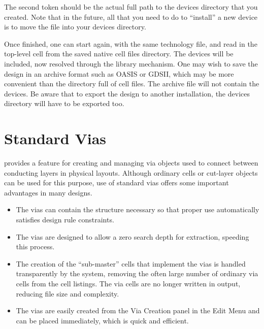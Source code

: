 The second token should be the actual full path to the {\vt devices}
directory that you created.  Note that in the future, all that you
need to do to ``install'' a new device is to move the file into your
{\vt devices} directory.

Once finished, one can start {\Xic} again, with the same technology
file, and read in the top-level cell from the saved native cell files
directory.  The devices will be included, now resolved through the
library mechanism.  One may wish to save the design in an archive
format such as OASIS or GDSII, which may be more convenient than the
directory full of cell files.  The archive file will not contain the
devices.  Be aware that to export the design to another {\Xic}
installation, the {\vt devices} directory will have to be exported
too.
\fi


\section{Standard Vias}
\label{stdvia}

{\Xic} provides a feature for creating and managing via objects used
to connect between conducting layers in physical layouts.  Although
ordinary cells or cut-layer objects can be used for this purpose, use
of standard vias offers some important advantages in many designs.

\begin{itemize}
\item{The vias can contain the structure necessary so that proper use
automatically satisfies design rule constraints.}

\item{The vias are designed to allow a zero search depth for
extraction, speeding this process.}

\item{The creation of the ``sub-master'' cells that implement the vias
is handled transparently by the system, removing the often large
number of ordinary via cells from the cell listings.  The via cells
are no longer written in output, reducing file size and complexity.}

\item{The vias are easily created from the {\cb Via Creation} panel in
the {\cb Edit Menu} and can be placed immediately, which is quick and
efficient.}
\end{itemize}

